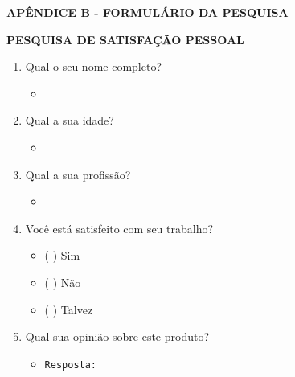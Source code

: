 \newpage
{}
{} 
\begin{center}
\textbf{\MakeUppercase{Apêndice B - Formulário da pesquisa}}
\end{center}
\vspace{30pt}
\begin{center}\textbf{\MakeUppercase{Pesquisa de satisfação pessoal}}\end{center}
\vspace{20pt}
\begin{enumerate}[label=\textbf{Pergunta \arabic*.}, leftmargin=*, itemsep=5pt]
    \item Qual o seu nome completo?
        \begin{itemize}
            \item \mbox{}\hrulefill
        \end{itemize}
    \item Qual a sua idade?
        \begin{itemize}
            \item \mbox{}\hrulefill
        \end{itemize}
    \item Qual a sua profissão?
        \begin{itemize}
            \item \mbox{}\hrulefill
        \end{itemize}
    \item Você está satisfeito com seu trabalho?
        \begin{itemize}
            \item ( ) Sim
            \item ( ) Não
            \item ( ) Talvez
        \end{itemize}
    \item Qual sua opinião sobre este produto?
        \begin{itemize}
             \item \texttt{Resposta: \hrulefill}
        \end{itemize}
\end{enumerate}